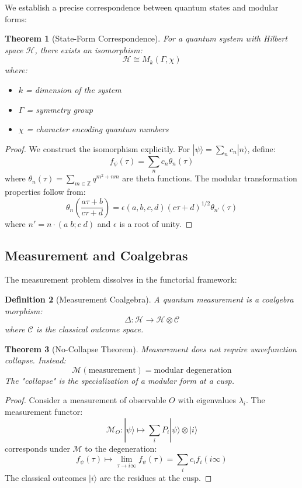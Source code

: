 \documentclass[12pt,a4paper]{article}
\newtheorem{theorem}{Theorem}[section]
\newtheorem{definition}[theorem]{Definition}
\begin{document}
We establish a precise correspondence between quantum states and modular forms:

\begin{theorem}[State-Form Correspondence]
For a quantum system with Hilbert space $\mathcal{H}$, there exists an isomorphism:
\[
\mathcal{H} \cong M_k(\Gamma, \chi)
\]
where:
\begin{itemize}
\item $k$ = dimension of the system
\item $\Gamma$ = symmetry group
\item $\chi$ = character encoding quantum numbers
\end{itemize}
\end{theorem}

\begin{proof}
We construct the isomorphism explicitly. For $|\psi\rangle = \sum_n c_n |n\rangle$, define:
\[
f_\psi(\tau) = \sum_n c_n \theta_n(\tau)
\]
where $\theta_n(\tau) = \sum_{m \in \mathbb{Z}} q^{m^2 + nm}$ are theta functions. The modular transformation properties follow from:
\[
\theta_n\left(\frac{a\tau + b}{c\tau + d}\right) = \epsilon(a,b,c,d) (c\tau + d)^{1/2} \theta_{n'}(\tau)
\]
where $n' = n \cdot (a \; b; c \; d)$ and $\epsilon$ is a root of unity.
\end{proof}

\subsection{Measurement and Coalgebras}

The measurement problem dissolves in the functorial framework:

\begin{definition}[Measurement Coalgebra]
A quantum measurement is a coalgebra morphism:
\[
\Delta: \mathcal{H} \to \mathcal{H} \otimes \mathcal{C}
\]
where $\mathcal{C}$ is the classical outcome space.
\end{definition}

\begin{theorem}[No-Collapse Theorem]
Measurement does not require wavefunction collapse. Instead:
\[
\mathcal{M}(\text{measurement}) = \text{modular degeneration}
\]
The "collapse" is the specialization of a modular form at a cusp.
\end{theorem}

\begin{proof}
Consider a measurement of observable $O$ with eigenvalues $\lambda_i$. The measurement functor:
\[
\mathcal{M}_O: |\psi\rangle \mapsto \sum_i P_i |\psi\rangle \otimes |i\rangle
\]
corresponds under $\mathcal{M}$ to the degeneration:
\[
f_\psi(\tau) \mapsto \lim_{\tau \to i\infty} f_\psi(\tau) = \sum_i c_i f_i(i\infty)
\]
The classical outcomes $|i\rangle$ are the residues at the cusp.
\end{proof}
\end{document}
